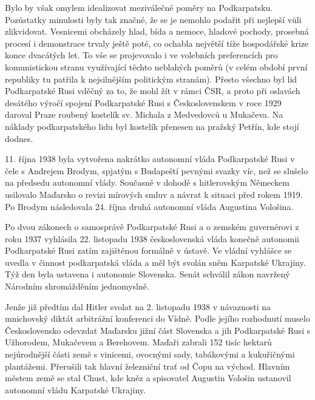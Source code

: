 \documentclass[10pt,a5paper,twoside]{book}
\begin{document}
\par Bylo by však omylem idealizovat meziválečné poměry na Podkarpatsku. Pozůstatky minulosti byly tak značné, že se je nemohlo podařit při nejlepší vůli zlikvidovat. Vesnicemi obcházely hlad, bída a nemoce, hladové pochody, prosebná procesí i demonstrace trvaly ještě poté, co ochabla největší tíže hospodářské krize konce dvacátých let. To vše se projevovalo i ve volebních preferencích pro komunistickou stranu využívající těchto neblahých poměrů (v celém období první republiky tu patřila k nejsilnějším politickým stranám). Přesto všechno byl lid Podkarpatské Rusi vděčný za to, že mohl žít v rámci ČSR, a proto při oslavách desátého výročí spojení Podkarpatské Rusi s Československem v roce 1929 daroval Praze roubený kostelík sv. Michala z Medvedovců u Mukačeva. Na náklady podkarpatského lidu byl kostelík přenesen na pražský Petřín, kde stojí dodnes.
\par 11. října 1938 byla vytvořena nakrátko autonomní vláda Podkarpatské Rusi v čele s Andrejem Brodym, spjatým s Budapeští pevnými svazky víc, než se slušelo na předsedu autonomní vlády. Současně v dohodě s hitlerovským Německem usilovalo Maďarsko o revizi mírových smluv a návrat k situaci před rokem 1919. Po Brodym následovala 24. října druhá autonomní vláda Augustina Vološina. 
\par Po dvou zákonech o samosprávě Podkarpatské Rusi a o zemském guvernérovi z roku 1937 vyhlásila 22. listopadu 1938 československá vláda konečně autonomii Podkarpatské Rusi zatím zajištěnou formálně v ústavě. Ve vládní vyhlášce se uvedla v činnost podkarpatská vláda a měl být svolán sněm Karpatské Ukrajiny. Týž den byla ustavena i autonomie Slovenska. Senát schválil zákon navržený Národním shromážděním jednomyslně.
\par Jenže již předtím dal Hitler svolat na 2. listopadu 1938 v návaznosti na mnichovský diktát arbitrážní konferenci do Vídně. Podle jejího rozhodnutí muselo Československo odevzdat Maďarsku jižní část Slovenska a jih Podkarpatské Rusi s Užhorodem, Mukačevem a Berehovem. Maďaři zabrali 152 tisíc hektarů nejúrodnější části země s vinicemi, ovocnými sady, tabákovými a kukuřičnými plantážemi. Přerušili tak hlavní železniční trať od Čopu na východ. Hlavním městem země se stal Chust, kde kněz a spisovatel Augustin Vološin ustanovil autonomní vládu Karpatské Ukrajiny.  
\newpage
\end{document}
